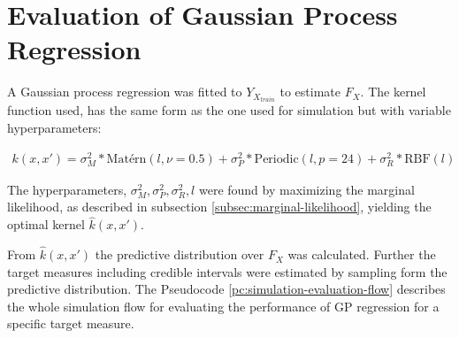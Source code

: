 \section{Evaluation of Gaussian Process Regression}\label{sec:evaluation-gaussian-process-regression}

A Gaussian process regression was fitted to $Y_{X_{train}}$ to estimate $F_X$.
The kernel function used, has the same form as the one used for simulation
but with variable hyperparameters:


\begin{gather*}\label{def:gp_fit}
    k(x, x')= \sigma_M^2 * \text{Matérn}(l, \nu=0.5) +
\sigma_P^2 * \text{Periodic}(l, p=24) +  \sigma_R^2 * \text{RBF}(l)
\end{gather*}

The hyperparameters, $\sigma_M^2, \sigma_P^2, \sigma_R^2, l$  were found by
maximizing the marginal likelihood, as described in subsection
\ref{subsec:marginal-likelihood}, yielding the optimal kernel $\hat{k}(x,x')$.

From $\hat{k}(x,x')$ the predictive distribution over $F_X$ was calculated.
Further the target measures including credible intervals were estimated by
sampling form the predictive distribution.
The Pseudocode \ref{pc:simulation-evaluation-flow} describes the whole simulation
flow for evaluating the performance of GP regression for a
specific target measure.

